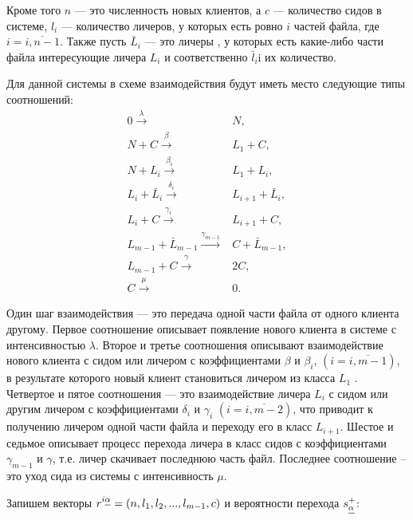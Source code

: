 \documentclass[floatfix,
showkeys,
twocolumn, nofootinbib, superscriptaddress, ]{revtex4-1}
\newcommand{\crd}[1]{\underline{\vphantom{j}{#1}}}
\begin{document}
Кроме того $n$ --- это численность новых клиентов, а $c$ ---
количество сидов в системе, $l_i$ --- количество личеров, у которых
есть ровно $i$ частей файла, где $i=\overline{i, n-1}$. Также пусть $
\bar{L}_i$ --- это личеры , у которых есть какие-либо части файла
интересующие личера $L_i$ и соответственно $ \bar{l}_i$i их
количество.

Для данной системы в схеме взаимодействия будут иметь место следующие
типы соотношений:
\begin{equation} 
\label{bt:7}
\begin{aligned}
0  \xrightarrow{\lambda } & N, \\
N+C  \xrightarrow{\beta } & L_1+C, \\
N+L_i  \xrightarrow{\beta_i } & L_1+L_i, \\
L_i + \bar{L}_i  \xrightarrow{\delta_i } & L_{i+1}+\bar{L}_i, \\
L_i + C  \xrightarrow{\gamma_i } & L_{i+1}+C, \\
L_{m-1} + \bar{L}_{m-1}  \xrightarrow{\gamma_{m-1} } & C+\bar{L}_{m-1}, \\
L_{m-1} + C  \xrightarrow{\gamma } & 2C, \\
C  \xrightarrow{\mu } & 0. 
\end{aligned}
\end{equation}

Один шаг взаимодействия --- это передача одной части файла от одного
клиента другому. Первое соотношение описывает появление нового клиента
в системе с интенсивностью $\lambda$. Второе и третье соотношения
описывают взаимодействие нового клиента с сидом или личером с
коэффициентами $\beta$ и $\beta_i$, $(i=\overline{i, m-1})$, в
результате которого новый клиент становиться личером из класса $L_1$
. Четвертое и пятое соотношения --- это взаимодействие личера $L_i$ с
сидом или другим личером с коэффициентами $\delta_i$ и $\gamma_i$
$(i=\overline{i, m-2})$, что приводит к получению личером одной части
файла и переходу его в класс $L_{i+1}$.  Шестое и седьмое описывает
процесс перехода личера в класс сидов с коэффициентами $\gamma_{m-1}$
и $\gamma$, т.е. личер скачивает последнюю часть файл. Последнее
соотношение – это уход сида из системы с интенсивность $\mu$.

Запишем векторы $r^{i\crd{\alpha}}=(n,l_1,l_2,...,l_{m-1},c)$ и 
вероятности перехода $s^+_{\crd{\alpha}}$:
\end{document}
